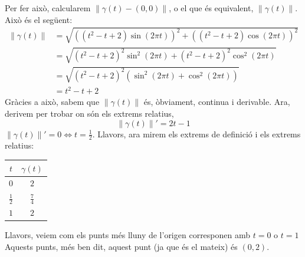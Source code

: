 \documentclass[a4paper, 12pt]{article}
\begin{document}
\begin{exercici}
\begin{enumerate}[label=\alph*)]
            \begin{solucio}
                Per fer això, calcularem $\left\lVert\gamma(t)-\left(0,0\right)\right\rVert$, o el
                que és equivalent, $\left\lVert\gamma(t)\right\rVert$. Això és el següent:
                \begin{displaymath}
                    \begin{split}
                        \left\lVert\gamma(t)\right\rVert &= \sqrt{\left((t^2-t+2)\sin{(2\pi t)}\right)^2+\left((t^2-t+2)\cos{(2\pi t)}\right)^2}\\
                        &= \sqrt{(t^2-t+2)^2\sin^2{(2\pi t)}+(t^2-t+2)^2\cos^2{(2\pi t)}}\\
                        &= \sqrt{(t^2-t+2)^2\left(\sin^2{(2\pi t)}+\cos^2{(2\pi t)}\right)}\\
                        &= t^2-t+2
                    \end{split}
                \end{displaymath}
                Gràcies a això, sabem que $\left\lVert\gamma(t)\right\rVert$ és, òbviament, continua
                i derivable. Ara, derivem per trobar on són els extrems relatius,
                \begin{displaymath}
                    \left\lVert\gamma(t)\right\rVert' = 2t-1
                \end{displaymath}
                $\left\lVert\gamma(t)\right\rVert' = 0 \iff t = \frac{1}{2}$. Llavors, ara mirem els
                extrems de definició i els extrems relatius:
                \begin{center}
                    \begin{tabular}[h]{|c|c|}
                        \hline
                        $t$ & $\gamma(t)$\\
                        \hline
                        $0$ & $2$\\
                        $\frac{1}{2}$ & $\frac{7}{4}$\\
                        $1$ & $2$\\
                        \hline
                    \end{tabular}
                \end{center}
                Llavors, veiem com els punts més lluny de l'origen corresponen amb $t = 0$ o $t=1$\\
                Aquests punts, més ben dit, aquest punt (ja que és el mateix) és $\left(0,2\right)$. 
            \end{solucio}

\end{enumerate}
\end{exercici}
\end{document}
